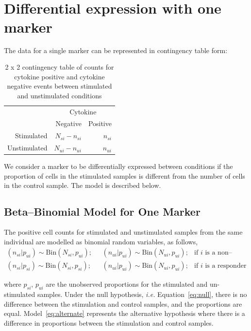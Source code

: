 \documentclass[11pt]{article}
\begin{document}
\section{Differential expression with one marker}
The data for a single marker can be represented in contingency table form:

\begin{table}[ht]
\centering
\parbox{0.8\linewidth}{
\caption{2 x 2 contingency table of counts for cytokine positive and cytokine negative events between stimulated and unstimulated conditions}\label{tab:twobytwo}
\centering
\begin{tabular}{rrr}

  \hline
\multicolumn{1}{l}{}&
\multicolumn{2}{c}{Cytokine}\\
 & Negative & Positive \\ 
  \hline
Stimulated &   $N_{si} - n_{si}$ &   $n_{si}$ \\ 
Unstimulated &   $N_{ui}-n_{ui}$ &   $n_{ui}$ \\ 
   \hline
\end{tabular}
}
\end{table}
We consider a marker to be differentially expressed between conditions if the proportion of cells in the stimulated samples is different from the number of cells in the control sample. The model is described below.

\subsection{Beta--Binomial Model for One Marker}
The positive cell counts for stimulated and unstimulated samples from the same individual are modelled as binomial random variables, as follows,
\begin{align}
(n_{si}|p_{ui}) \sim \mathrm{Bin}(N_{si},p_{ui});\text{ }& (n_{ui}|p_{ui}) \sim \mathrm{Bin}(N_{ui},p_{ui})\label{eq:null};&\text{if $i$ is a non--responder}\\
(n_{si}|p_{si}) \sim \mathrm{Bin}(N_{si},p_{si});\text{ }& (n_{ui}|p_{ui}) \sim \mathrm{Bin}(N_{ui},p_{ui});&\text{if $i$ is a responder}\label{eq:alternate}
 \end{align}
 
where $p_{si}$, $p_{ui}$ are the unobserved proportions for the stimulated and un-stimulated samples. Under the null hypothesis, \textit{i.e.} Equation~\ref{eq:null}, there is no difference between the stimulation and control samples, and the proportions are equal. Model~\eqref{eq:alternate} represents the  alternative hypothesis where there is a difference in proportions between the stimulation and control samples.
\end{document}
